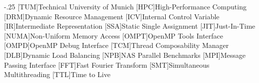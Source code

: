 \documentclass[headsepline,footsepline,footinclude=false,oneside,fontsize=11pt,paper=a4,listof=totoc,bibliography=totoc]{scrbook} %
\begin{document}


\frontmatter{}





% 
\tableofcontents{}

\mainmatter{}











\appendix{}


\begin{acronym}
	\itemsep-.25\baselineskip
	[TUM]{Technical University of Munich}
	[HPC]{High-Performance Computing}
	[DRM]{Dynamic Resource Management}
	[ICV]{Internal Control Variable}
	[IR]{Intermediate Representation}
	[SSA]{Static Single Assignment}
	[JIT]{Just-In-Time}
	[NUMA]{Non-Uniform Memory Access}
	[OMPT]{OpenMP Tools Interface}
	[OMPD]{OpenMP Debug Interface}
	[TCM]{Thread Composability Manager}
	[DLB]{Dynamic Load Balancing}
	[NPB]{NAS Parallel Benchmarks}
	[MPI]{Message Passing Interface}
	[FFT]{Fast Fourier Transform}
	[SMT]{Simultaneous Multithreading}
	[TTL]{Time to Live}
\end{acronym}

\printbibliography{}
\end{document}
